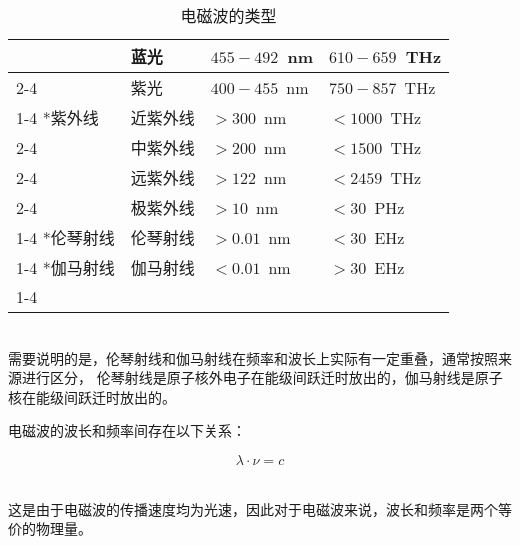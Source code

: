 \documentclass[UTF8]{ctexart}
\begin{document}
\begin{table}[h]
\begin{center}
\begin{tabular}{l|l|l|l}
                &蓝光&$455-492$~nm&$610-659$~THz\\ \cline{2-4}
                &紫光&$400-455$~nm&$750-857$~THz\\ \cline{1-4}
                \multirow{4}*{紫外线}
                &近紫外线&$>300$~nm&$<1000$~THz\\ \cline{2-4}
                &中紫外线&$>200$~nm&$<1500$~THz\\ \cline{2-4}
                &远紫外线&$>122$~nm&$<2459$~THz\\ \cline{2-4}
                &极紫外线&$>10$~nm&$<30$~PHz\\ \cline{1-4}
                \multirow{1}*{伦琴射线}
                &伦琴射线&$>0.01$~nm&$<30$~EHz\\ \cline{1-4}
                \multirow{1}*{伽马射线}
                &伽马射线&$<0.01$~nm&$>30$~EHz\\ \cline{1-4}
            \end{tabular}
            \caption{电磁波的类型}
        \end{center}
    \end{table}\\
    需要说明的是，伦琴射线和伽马射线在频率和波长上实际有一定重叠，通常按照来源进行区分，
    伦琴射线是原子核外电子在能级间跃迁时放出的，伽马射线是原子核在能级间跃迁时放出的。

\newpage

    电磁波的波长和频率间存在以下关系：
    \begin{large}
        \begin{equation*}
            \lambda\cdot\nu=c
        \end{equation*}
    \end{large}\\
    这是由于电磁波的传播速度均为光速，因此对于电磁波来说，波长和频率是两个等价的物理量。\\
\end{document}
